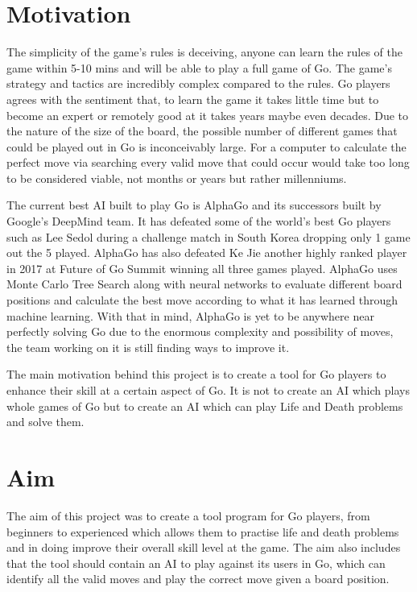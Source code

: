 \documentclass{l4proj}
\begin{document}
\section{Motivation}
The simplicity of the game's rules is deceiving, anyone can learn the rules of the game within 5-10 mins and will be able to play a full game of Go. The game's strategy and tactics are incredibly complex compared to the rules. Go players agrees with the sentiment that, to learn the game it takes little time but to become an expert or remotely good at it takes years maybe even decades. Due to the nature of the size of the board, the possible number of different games that could be played out in Go is inconceivably large. For a computer to calculate the perfect move via searching every valid move that could occur would take too long to be considered viable, not months or years but rather millenniums.

The current best AI built to play Go is AlphaGo \cite{AlphaGo} and its successors built by Google’s DeepMind team. It has defeated some of the world’s best Go players such as Lee Sedol during a challenge match in South Korea dropping only 1 game out the 5 played. AlphaGo has also defeated Ke Jie another highly ranked player in 2017 at Future of Go Summit winning all three games played. AlphaGo uses Monte Carlo Tree Search along with neural networks to evaluate different board positions and calculate the best move according to what it has learned through machine learning. With that in mind, AlphaGo is yet to be anywhere near perfectly solving Go due to the enormous complexity and possibility of moves, the team working on it is still finding ways to improve it.

The main motivation behind this project is to create a tool for Go players to enhance their skill at a certain aspect of Go. It is not to create an AI which plays whole games of Go but to create an AI which can play Life and Death problems and solve them.


\section{Aim}
The aim of this project was to create a tool program for Go players, from beginners to experienced which allows them to practise life and death problems and in doing improve their overall skill level at the game.  The aim also includes that the tool should contain an AI to play against its users in Go, which can identify all the valid moves and play the correct move given a board position.
\end{document}
